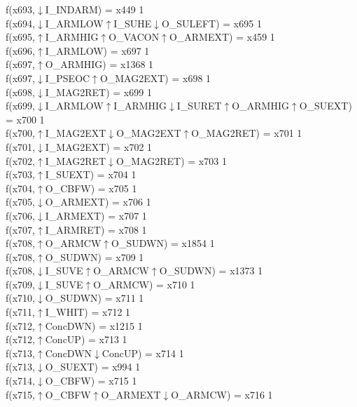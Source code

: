 f(x693,$\downarrow$I\_INDARM) = x449 {1} \\
f(x694,$\downarrow$I\_ARMLOW$\uparrow$I\_SUHE$\downarrow$O\_SULEFT) = x695 {1} \\
f(x695,$\uparrow$I\_ARMHIG$\uparrow$O\_VACON$\uparrow$O\_ARMEXT) = x459 {1} \\
f(x696,$\uparrow$I\_ARMLOW) = x697 {1} \\
f(x697,$\uparrow$O\_ARMHIG) = x1368 {1} \\
f(x697,$\downarrow$I\_PSEOC$\uparrow$O\_MAG2EXT) = x698 {1} \\
f(x698,$\downarrow$I\_MAG2RET) = x699 {1} \\
f(x699,$\downarrow$I\_ARMLOW$\uparrow$I\_ARMHIG$\downarrow$I\_SURET$\uparrow$O\_ARMHIG$\uparrow$O\_SUEXT) = x700 {1} \\
f(x700,$\uparrow$I\_MAG2EXT$\downarrow$O\_MAG2EXT$\uparrow$O\_MAG2RET) = x701 {1} \\
f(x701,$\downarrow$I\_MAG2EXT) = x702 {1} \\
f(x702,$\uparrow$I\_MAG2RET$\downarrow$O\_MAG2RET) = x703 {1} \\
f(x703,$\uparrow$I\_SUEXT) = x704 {1} \\
f(x704,$\uparrow$O\_CBFW) = x705 {1} \\
f(x705,$\downarrow$O\_ARMEXT) = x706 {1} \\
f(x706,$\downarrow$I\_ARMEXT) = x707 {1} \\
f(x707,$\uparrow$I\_ARMRET) = x708 {1} \\
f(x708,$\uparrow$O\_ARMCW$\uparrow$O\_SUDWN) = x1854 {1} \\
f(x708,$\uparrow$O\_SUDWN) = x709 {1} \\
f(x708,$\downarrow$I\_SUVE$\uparrow$O\_ARMCW$\uparrow$O\_SUDWN) = x1373 {1} \\
f(x709,$\downarrow$I\_SUVE$\uparrow$O\_ARMCW) = x710 {1} \\
f(x710,$\downarrow$O\_SUDWN) = x711 {1} \\
f(x711,$\uparrow$I\_WHIT) = x712 {1} \\
f(x712,$\uparrow$ConcDWN) = x1215 {1} \\
f(x712,$\uparrow$ConcUP) = x713 {1} \\
f(x713,$\uparrow$ConcDWN$\downarrow$ConcUP) = x714 {1} \\
f(x713,$\downarrow$O\_SUEXT) = x994 {1} \\
f(x714,$\downarrow$O\_CBFW) = x715 {1} \\
f(x715,$\uparrow$O\_CBFW$\uparrow$O\_ARMEXT$\downarrow$O\_ARMCW) = x716 {1} \\
